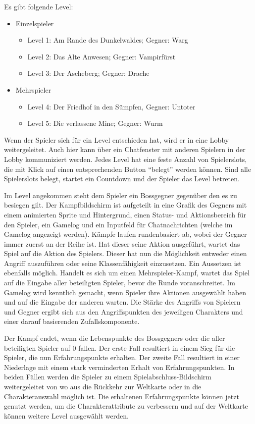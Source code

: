 Es gibt folgende Level:
\begin{itemize}
    \item Einzelspieler
    \begin{itemize}
        \item Level 1:  Am Rande des Dunkelwaldes; Gegner: Warg
        \item Level 2:  Das Alte Anwesen; Gegner: Vampirfürst
        \item Level 3:  Der Ascheberg; Gegner: Drache
    \end{itemize}
    \item Mehrspieler
    \begin{itemize}
        \item Level 4:  Der Friedhof in den Sümpfen, Gegner: Untoter
        \item Level 5:  Die verlassene Mine; Gegner: Wurm
    \end{itemize}
\end{itemize}

Wenn der Spieler sich für ein Level entschieden hat, wird er in eine Lobby weitergeleitet. Auch hier kann über ein Chatfenster mit anderen Spielern in der Lobby kommuniziert werden. Jedes Level hat eine feste Anzahl von Spielerslots, die mit Klick auf einen entsprechenden Button \enquote{belegt} werden können. Sind alle Spielerslots belegt, startet ein Countdown und der Spieler das Level betreten. 

Im Level angekommen steht dem Spieler ein Bossgegner gegenüber den es zu besiegen gilt. Der Kampfbildschirm ist aufgeteilt in eine Grafik des Gegners mit einem animierten Sprite und Hintergrund, einen Status- und Aktionsbereich für den Spieler, ein Gamelog und ein Inputfeld für Chatnachrichten (welche im Gamelog angezeigt werden). Kämpfe laufen rundenbasiert ab, wobei der Gegner immer zuerst an der Reihe ist. Hat dieser seine Aktion ausgeführt, wartet das Spiel auf die Aktion des Spielers. Dieser hat nun die Möglichkeit entweder einen Angriff auszuführen oder seine Klassenfähigkeit einzusetzen. Ein Aussetzen ist ebenfalls möglich.
Handelt es sich um einen Mehrspieler-Kampf, wartet das Spiel auf die Eingabe aller beteiligten Spieler, bevor die Runde voranschreitet. Im Gamelog wird kenntlich gemacht, wenn Spieler ihre Aktionen ausgewählt haben und auf die Eingabe der anderen warten. 
Die Stärke des Angriffs von Spielern und Gegner ergibt sich aus den Angriffspunkten des jeweiligen Charakters und einer darauf basierenden Zufallskomponente.

Der Kampf endet, wenn die Lebenspunkte des Bossgegners oder die aller beteiligten Spieler auf 0 fallen. Der erste Fall resultiert in einem Sieg für die Spieler, die nun Erfahrungspunkte erhalten. Der zweite Fall resultiert in einer Niederlage mit einem stark verminderten Erhalt von Erfahrungspunkten. In beiden Fällen werden die Spieler zu einem Spielabschluss-Bildschirm weitergeleitet von wo aus die Rückkehr zur Weltkarte oder in die Charakterauswahl möglich ist. Die erhaltenen Erfahrungspunkte können jetzt genutzt werden, um die Charakterattribute zu verbessern und auf der Weltkarte können weitere Level ausgewählt werden.


